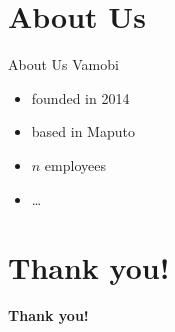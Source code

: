 \documentclass{beamer}
\begin{document}
\section{About Us}
\begin{frame}{About Us}
  Vamobi
  \begin{itemize}
  \item founded in 2014
  \item based in Maputo
  \item $n$ employees
  \item \dots
  \end{itemize}
\end{frame}


\section{Thank you!}
\begin{frame}{}
  \vskip1.5cm
  \begin{center}
    \textbf{\Huge Thank you!}
  \end{center}
\end{frame}
\end{document}
